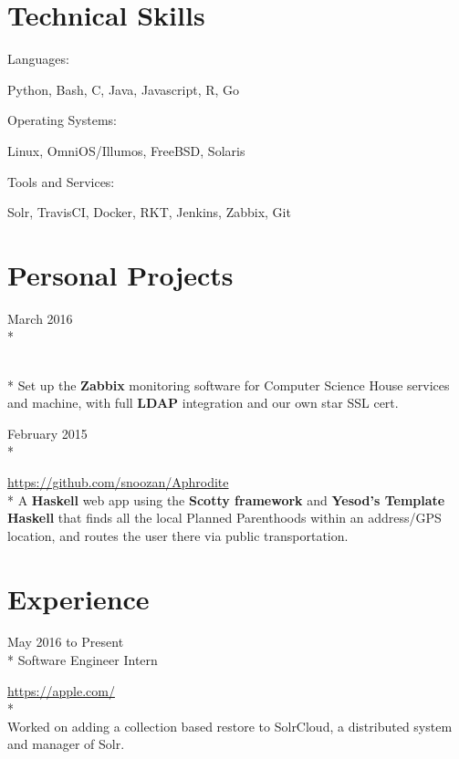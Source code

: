 \documentclass[a4paper,margin,line]{resume}
\newcommand{\rurl}[1]{\hfill {\footnotesize \url{#1}}}
\newcommand{\rdate}[1]{\hfill {\small #1}}
\newcommand{\rproject}[4]{\item[#1] \hfill \rdate{#2} \\* \hfill \rdate{#3} \strut\hfill \rurl{#4} \\*}
\begin{document}
\begin{resume}
\section{\mysidestyle Technical Skills}
	\begin{compactdesc}
		\item[Languages: ] \begin{asparablank} { \small
			\item Python, Bash, C, Java, Javascript, R, Go
		} \end{asparablank}
		\item[Operating Systems: ] \begin{asparablank} { \small
            \item Linux, OmniOS/Illumos, FreeBSD, Solaris
		} \end{asparablank}
		\item[Tools and Services: ] \begin{asparablank} { \small
            \item Solr, TravisCI, Docker, RKT, Jenkins, Zabbix, Git
		} \end{asparablank}
	\end{compactdesc}

\section{\mysidestyle Personal Projects}
    \begin{asparadesc}
        \rproject{Zabbix for Computer Science House}{March 2016}{}{}
        \small
        Set up the {\bf Zabbix} monitoring software for Computer Science House services 
        and machine, with full {\bf LDAP} integration and our own star SSL cert.
        \normalsize
        \\
        \rproject{Aphrodite}{February 2015}{}{https://github.com/snoozan/Aphrodite}
        \small
        A {\bf Haskell} web app using the {\bf Scotty framework} and {\bf Yesod's Template Haskell} 
        that finds all the local Planned Parenthoods within an address/GPS location, and routes the user
        there via public transportation.
        \normalsize
    \end{asparadesc}

\section{\mysidestyle Experience}
	\begin{asparadesc}
        \rproject{Apple}{May 2016 to Present}{Software Engineer Intern}{https://apple.com/}
        \\
        \small
        Worked on adding a collection based restore to SolrCloud, a distributed system and manager
        of Solr.
        \normalsize
        \\


\end{asparadesc}
\end{resume}
\end{document}
